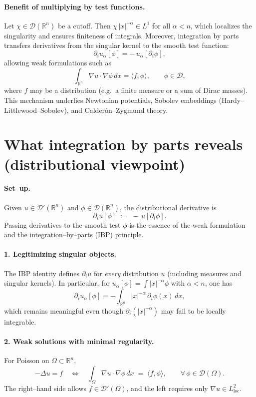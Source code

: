 \documentclass[12pt,a4paper]{article}
\theoremstyle{plain}
\theoremstyle{definition}
\theoremstyle{remark}
\theoremstyle{remark}
\begin{document}
\bigskip

\paragraph{Benefit of multiplying by test functions.}
Let $\chi\in\mathcal{D}(\mathbb{R}^n)$ be a cutoff. Then $\chi\,|x|^{-\alpha}\in L^1$ for all $\alpha<n$, which localizes the singularity and ensures finiteness of integrals.
Moreover, integration by parts transfers derivatives from the singular kernel to the smooth test function:
\[
\partial_i u_\alpha[\phi] = -\,u_\alpha[\partial_i\phi],
\]
allowing weak formulations such as
\[
\int_{\mathbb{R}^n}\nabla u\cdot\nabla\phi \,dx = \langle f,\phi\rangle,\qquad \phi\in\mathcal{D},
\]
where $f$ may be a distribution (e.g.\ a finite measure or a sum of Dirac masses).
This mechanism underlies Newtonian potentials, Sobolev embeddings (Hardy--Littlewood--Sobolev), and Calder\'on--Zygmund theory.


\section*{What integration by parts reveals (distributional viewpoint)}

\paragraph{Set--up.}
Given $u\in\mathcal D'(\mathbb R^n)$ and $\phi\in\mathcal D(\mathbb R^n)$, the distributional derivative is
\[
\partial_i u[\phi] \;:=\; -\,u[\partial_i\phi].
\]
Passing derivatives to the smooth test $\phi$ is the essence of the weak formulation and the
integration--by--parts (IBP) principle.

\bigskip

\paragraph{1. Legitimizing singular objects.}
The IBP identity defines $\partial_i u$ for \emph{every} distribution $u$ (including measures and singular kernels).
In particular, for $u_\alpha[\phi]=\int |x|^{-\alpha}\phi$ with $\alpha<n$, one has
\[
\partial_i u_\alpha[\phi] = -\int_{\mathbb R^n} |x|^{-\alpha}\,\partial_i\phi(x)\,dx,
\]
which remains meaningful even though $\partial_i(|x|^{-\alpha})$ may fail to be locally integrable.

\smallskip

\paragraph{2. Weak solutions with minimal regularity.}
For Poisson on $\Omega\subset\mathbb R^n$,
\[
-\Delta u=f \quad\Longleftrightarrow\quad
\int_\Omega \nabla u\cdot\nabla\phi \,dx \;=\; \langle f,\phi\rangle,
\qquad \forall\,\phi\in\mathcal D(\Omega).
\]
The right--hand side allows $f\in\mathcal D'(\Omega)$, and the left requires only $\nabla u\in L^2_{\mathrm{loc}}$.
\end{document}
